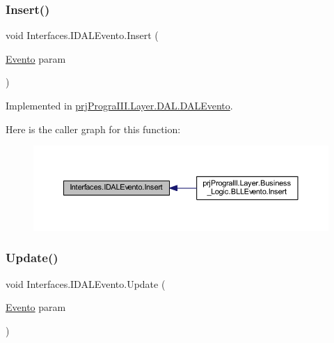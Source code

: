 \subsubsection{\texorpdfstring{Insert()}{Insert()}}
{\footnotesize\ttfamily void Interfaces.\+I\+D\+A\+L\+Evento.\+Insert (\begin{DoxyParamCaption}\item[{\hyperlink{classprj_progra_i_i_i_1_1_layer_1_1_entities_1_1_evento}{Evento}}]{param }\end{DoxyParamCaption})}



Implemented in \hyperlink{classprj_progra_i_i_i_1_1_layer_1_1_d_a_l_1_1_d_a_l_evento_a0bc4cec389945eb6f5f796c63616d032}{prj\+Progra\+I\+I\+I.\+Layer.\+D\+A\+L.\+D\+A\+L\+Evento}.

Here is the caller graph for this function\+:
\nopagebreak
\begin{figure}[H]
\begin{center}
\leavevmode
\includegraphics[width=350pt]{interface_interfaces_1_1_i_d_a_l_evento_a52962146e03ae6b9b86e487e01640832_icgraph}
\end{center}
\end{figure}
\hypertarget{interface_interfaces_1_1_i_d_a_l_evento_a891007642c180aaf3224fd217361bd7b}{}\label{interface_interfaces_1_1_i_d_a_l_evento_a891007642c180aaf3224fd217361bd7b} 
\subsubsection{\texorpdfstring{Update()}{Update()}}
{\footnotesize\ttfamily void Interfaces.\+I\+D\+A\+L\+Evento.\+Update (\begin{DoxyParamCaption}\item[{\hyperlink{classprj_progra_i_i_i_1_1_layer_1_1_entities_1_1_evento}{Evento}}]{param }\end{DoxyParamCaption})}



